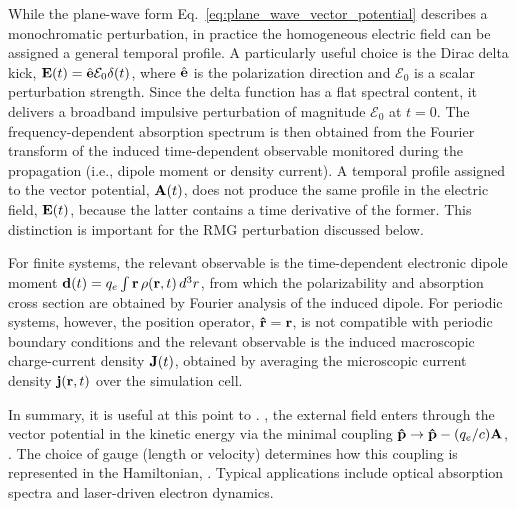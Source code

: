 While the plane-wave form Eq.~\eqref{eq:plane_wave_vector_potential}
describes a monochromatic perturbation, in practice
the homogeneous electric field can be assigned a general
temporal profile.
A particularly useful choice is the Dirac delta kick, 
 $\vb E(t)=\hat{\vb e} \mathcal E_0\delta(t)$, where
$\hat{\vb e}$ is the polarization direction and $\mathcal E_0$ is  a scalar  perturbation strength.
Since the delta function has a flat spectral content, 
it delivers a broadband impulsive perturbation of magnitude $\mathcal E_0$ at $t=0$. 
The frequency-dependent absorption spectrum is then obtained from
the Fourier transform of the induced time-dependent observable
monitored during the propagation (i.e., dipole moment or density current).
A temporal profile assigned to the vector potential, $\vb A(t)$, does not
produce the same profile in the electric field, $\vb E(t)$, because the latter
contains a time derivative of the former. 
This distinction is important for the RMG perturbation discussed
below. 


For finite systems, the relevant observable is the time-dependent
electronic dipole moment
$\vb d(t)=q_e\int\vb r\,\rho(\vb r,t)\,d^3r$,
from which the polarizability and absorption cross section are obtained
by Fourier analysis of the induced dipole.\cite{yabana-bertsch-1996,jakowski-rmg-tddft-2025}
For periodic systems, however, the position operator, $\vb {\hat r} =\vb r$,
is not compatible with periodic boundary conditions and  the relevant observable is
the induced macroscopic charge-current density
$\vb J(t)$, obtained by averaging the microscopic current density
$\vb j(\vb r,t)$ over the simulation cell.\cite{Luber-2023-position-operator,Resta-polarization-1994,KingSmith-Vanderbilt-polarization-1993}


In summary, it is useful at this point to .
,
the external field enters through the vector potential in the
kinetic energy via the minimal coupling
$\vb{\hat p}\to\vb{\hat p}-(q_e/c)\vb A$,
.
The choice of gauge (length or velocity) determines how
this coupling is represented in the Hamiltonian,
.
Typical applications include optical absorption spectra
and laser-driven electron dynamics.
\cite{Gross-2015-demagnetization}
\cite{Rubio-angular-2017} 


